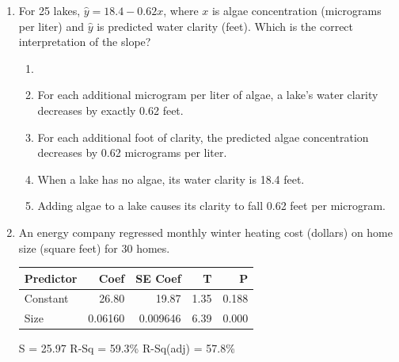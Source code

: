 \documentclass[12pt]{article}
\begin{document}
\begin{enumerate}[leftmargin=1.9em, itemsep=0.13in]
  \boxguard[11]%
  \item For 25 lakes, $\hat{y} = 18.4 - 0.62x$, where $x$ is algae concentration (micrograms
        per liter) and $\hat{y}$ is predicted water clarity (feet). Which is the correct
        interpretation of the slope?
        \begin{enumerate}[label=\textbf{(\Alph*)}, leftmargin=2.2em, itemsep=2pt]
          \item {}
          \item For each additional microgram per liter of algae, a lake's water clarity
                decreases by exactly 0.62 feet.
          \item For each additional foot of clarity, the predicted algae concentration
                decreases by 0.62 micrograms per liter.
          \item When a lake has no algae, its water clarity is 18.4 feet.
          \item Adding algae to a lake causes its clarity to fall 0.62 feet per microgram.\hfill{}\rule[-0.2in]{0pt}{0.48in}
        \end{enumerate}

  \boxguard[15]%
  \item An energy company regressed monthly winter heating cost (dollars) on home size
        (square feet) for 30 homes.

        \vspace{2pt}
        {\centering\footnotesize\ttfamily
        \begin{tabular}{@{} l r r r r @{}}
        Predictor & Coef & SE Coef & T & P \\ \hline
        Constant & 26.80 & 19.87 & 1.35 & 0.188 \\
        Size & 0.06160 & 0.009646 & 6.39 & 0.000 \\
        \end{tabular}\par
        S = 25.97 \quad R-Sq = 59.3\% \quad R-Sq(adj) = 57.8\%\par}
        \vspace{2pt}


\end{enumerate}
\end{document}
